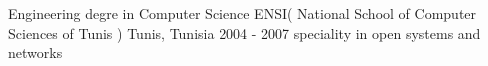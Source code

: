 


\begin{cventries}


\cventry
{Engineering degre in Computer Science} %
{ENSI( National School of Computer Sciences of Tunis )} %
{Tunis, Tunisia} %
{2004 - 2007} %
{ %
speciality in open systems and networks
}


\end{cventries}